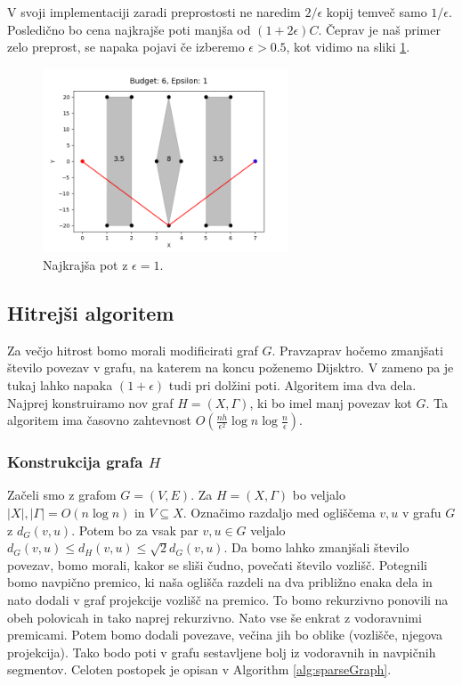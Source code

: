 \documentclass{article}
\begin{document}
V svoji implementaciji zaradi preprostosti ne naredim $2/\epsilon$ kopij temveč samo $1/\epsilon$. Posledično bo cena najkrajše poti manjša od $(1 + 2\epsilon)C$. Čeprav je naš primer zelo preprost, se napaka pojavi če izberemo $\epsilon > 0.5$, kot vidimo na sliki \ref{fig:errP05}.

\begin{figure}[ht]
    \centering
    \includegraphics[width=0.65\textwidth]{errPathEps1.png}
    \caption{Najkrajša pot z $\epsilon = 1$.}
    \label{fig:errP05}
\end{figure}




\subsection*{Hitrejši algoritem}

Za večjo hitrost bomo morali modificirati graf $G$. Pravzaprav hočemo zmanjšati število povezav v grafu, na katerem na koncu poženemo Dijsktro. V zameno pa je tukaj lahko napaka $(1+\epsilon)$ tudi pri dolžini poti. Algoritem ima dva dela. Najprej konstruiramo nov graf $H = (X,\Gamma)$, ki bo imel manj povezav kot $G$. Ta algoritem ima časovno zahtevnost $O(\frac{nh}{\epsilon^2}\log n \log \frac{n}{\epsilon})$. 

\subsubsection*{Konstrukcija grafa $H$}

Začeli smo z grafom $G = (V,E)$. Za $H = (X,\Gamma)$ bo veljalo $|X|, |\Gamma| = O(n \log n)$ in $V \subseteq X$. Označimo razdaljo med ogliščema $v,u$ v grafu $G$ z $d_G(v,u)$. Potem bo za vsak par $v,u \in G$ veljalo  $d_G(v,u) \leq d_H(v,u) \leq \sqrt{2}d_G(v,u)$. Da bomo lahko zmanjšali število povezav, bomo morali, kakor se sliši čudno, povečati število vozlišč. Potegnili bomo navpično premico, ki naša oglišča razdeli na dva približno enaka dela in nato dodali v graf projekcije vozlišč na premico. To bomo rekurzivno ponovili na obeh polovicah in tako naprej rekurzivno. Nato vse še enkrat z vodoravnimi premicami. Potem bomo dodali povezave, večina jih bo oblike (vozlišče, njegova projekcija). Tako bodo poti v grafu sestavljene bolj iz vodoravnih in navpičnih segmentov. Celoten postopek je opisan v Algorithm \ref{alg:sparseGraph}.
\end{document}
